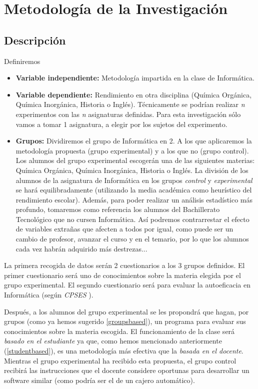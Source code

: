 \documentclass[palatino,miniheader]{apuntesURJC}
\newcommand{\CPSES}{\textit{\gls{CPSES}} \cite{CPSES}}
\begin{document}
\chapter{Metodología de la Investigación}

\section{Descripción}
Definiremos 
\begin{itemize}
	\item \textbf{Variable independiente:} Metodología impartida en la clase de Informática.
	\item \textbf{Variable dependiente:} Rendimiento en otra disciplina (Química Orgánica, Química Inorgánica, Historia o Inglés).
	\subitem Técnicamente se podrían realizar \textit{n} experimentos con las \textit{n} asignaturas definidas. 
	Para esta investigación sólo vamos a tomar 1 asignatura, a elegir por los sujetos del experimento.
	\item \textbf{Grupos:}
	\subitem Dividiremos el grupo de Informática en 2. A los que aplicaremos la  metodología propuesta (grupo experimental) y a los que no (grupo control).
	Los alumnos del grupo experimental escogerán una de las siguientes materias: Química Orgánica, Química Inorgánica, Historia o Inglés.
	\subitem La división de los alumnos de la asignatura de Informática en los grupos \textit{control} y \textit{experimental} se hará equilibradamente (utilizando la media académica como heurístico del rendimiento escolar).
	\subitem Además, para poder realizar un análisis estadístico más profundo, tomaremos como referencia los alumnos del Bachillerato Tecnológico que no cursen Informática.
	Así podremos contrarrestar el efecto de variables extrañas que afecten a todos por igual, como puede ser un cambio de profesor, avanzar el curso y en el temario, por lo que los alumnos cada vez habrán adquirido más destrezas...
\end{itemize}


La primera recogida de datos serán 2 cuestionarios a los 3 grupos definidos.
%
\label{descDatos}
%
El primer cuestionario será uno de conocimientos sobre la materia elegida por el grupo experimental.
%
El segundo cuestionario será para evaluar la autoeficacia en Informática (según \CPSES).

Después, a los alumnos del grupo experimental se les propondrá que hagan, por grupos (como ya hemos sugerido \ref{groupsbased}), un programa para evaluar sus conocimientos sobre la materia escogida.
%
El funcionamiento de la clase será \textit{basado en el estudiante} ya que, como hemos mencionado anteriormente (\ref{studentbased}), es una metodología más efectiva que la \textit{basada en el docente}.
%
Mientras el grupo experimental ha recibido esta propuesta, el grupo control recibirá las instrucciones que el docente considere oportunas para desarrollar un software similar (como podría ser el de un cajero automático).
\end{document}
